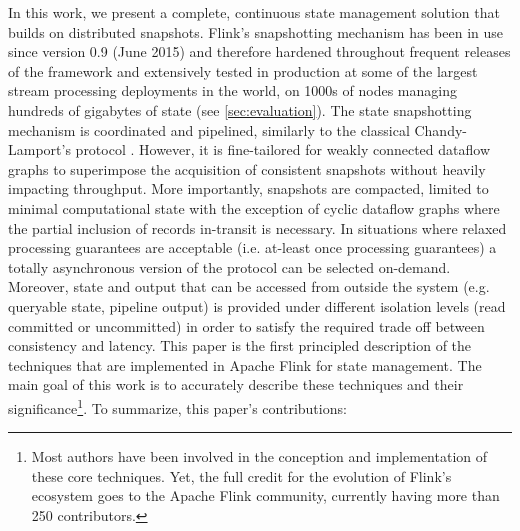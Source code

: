 


In this work, we present a complete, continuous state management solution that builds on distributed snapshots. Flink's snapshotting mechanism has been in use since version 0.9 (June 2015) and therefore hardened throughout frequent releases of the framework and extensively tested in production at some of the largest stream processing deployments in the world, on 1000s of nodes  managing hundreds of gigabytes of state (see \autoref{sec:evaluation}). 
The state snapshotting mechanism is coordinated and pipelined, similarly to the classical Chandy-Lamport's protocol \cite{chandy1985distributed}. However, it is fine-tailored for weakly connected dataflow graphs to superimpose the acquisition of consistent snapshots without heavily impacting throughput. More importantly, snapshots are compacted, limited to minimal computational state with the exception of cyclic dataflow graphs where the partial inclusion of records in-transit is necessary. In situations where relaxed processing guarantees are acceptable (i.e. at-least once processing guarantees) a totally asynchronous version of the protocol can be selected on-demand. 
Moreover, state and output that can be accessed from outside the system (e.g. queryable state, pipeline output) is provided under different isolation levels (read committed or uncommitted) in order to satisfy the required trade off between consistency and latency. 
This paper is the first principled description of the techniques that are implemented in Apache Flink for state management. The main goal of this work is to accurately describe these techniques and their significance\footnote{Most authors have been involved in the conception and implementation of these core techniques. Yet, the full credit for the evolution of Flink's ecosystem goes to the Apache Flink community, currently having more than 250 contributors.}. To summarize, this paper's contributions:


